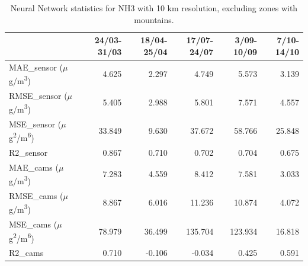 \begin{table}[H]
\begin{tabular}{lrrrrr}
\toprule
 &  24/03-31/03 &  18/04-25/04 &  17/07-24/07 &  3/09-10/09 &  7/10-14/10 \\
\midrule
 MAE\_sensor ($\mu$g/m\textsuperscript{3})&        4.625 &        2.297 &        4.749 &       5.573 &       3.139 \\
RMSE\_sensor ($\mu$g/m\textsuperscript{3})&        5.405 &        2.988 &        5.801 &       7.571 &       4.557 \\
 MSE\_sensor ($\mu$g\textsuperscript{2}/m\textsuperscript{6})&       33.849 &        9.630 &       37.672 &      58.766 &      25.848 \\
  R2\_sensor &        0.867 &        0.710 &        0.702 &       0.704 &       0.675 \\
   MAE\_cams ($\mu$g/m\textsuperscript{3})&        7.283 &        4.559 &        8.412 &       7.581 &       3.033 \\
  RMSE\_cams ($\mu$g/m\textsuperscript{3})&        8.867 &        6.016 &       11.236 &      10.874 &       4.072 \\
   MSE\_cams ($\mu$g\textsuperscript{2}/m\textsuperscript{6})&       78.979 &       36.499 &      135.704 &     123.934 &      16.818 \\
    R2\_cams &        0.710 &       -0.106 &       -0.034 &       0.425 &       0.591 \\
\bottomrule
\end{tabular}
\caption{Neural Network statistics for NH3 with 10 km resolution, excluding zones with mountains.}
\end{table}
